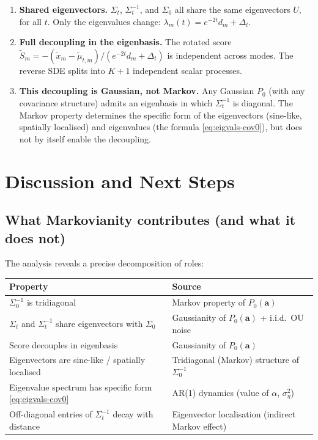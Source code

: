 \documentclass[11pt,a4paper]{article}
\newcommand{\Dt}{\Delta_t}
\newcommand{\sigeta}{\sigma_\eta^2}
\begin{document}
\begin{keyresult}
\begin{enumerate}[label=\textbf{\arabic*.}, leftmargin=2em]
  \item \textbf{Shared eigenvectors.}  $\Sigma_t$, $\Sigma_t^{-1}$, and $\Sigma_0$ all share the same eigenvectors $U$, for all $t$.  Only the eigenvalues change: $\lambda_m(t) = e^{-2t}d_m + \Dt$.

  \item \textbf{Full decoupling in the eigenbasis.}  The rotated score $\tilde{S}_m = -(\tilde{x}_m - \tilde{\mu}_{t,m})/(e^{-2t}d_m + \Dt)$ is independent across modes.  The reverse SDE splits into $K+1$ independent scalar processes.

  \item \textbf{This decoupling is Gaussian, not Markov.}  Any Gaussian $P_0$ (with any covariance structure) admits an eigenbasis in which $\Sigma_t^{-1}$ is diagonal.  The Markov property determines the specific form of the eigenvectors (sine-like, spatially localised) and eigenvalues (the formula \eqref{eq:eigvals-cov0}), but does not by itself enable the decoupling.
\end{enumerate}
\end{keyresult}


\section{Discussion and Next Steps}
\label{sec:discussion}

\subsection{What Markovianity contributes (and what it does not)}

The analysis reveals a precise decomposition of roles:

\medskip
\begin{tabular}{@{}lp{10cm}@{}}
\toprule
\textbf{Property} & \textbf{Source} \\
\midrule
$\Sigma_0^{-1}$ is tridiagonal & Markov property of $P_0(\mathbf{a})$ \\
$\Sigma_t$ and $\Sigma_t^{-1}$ share eigenvectors with $\Sigma_0$ & Gaussianity of $P_0(\mathbf{a})$ + i.i.d.\ OU noise \\
Score decouples in eigenbasis & Gaussianity of $P_0(\mathbf{a})$ \\
Eigenvectors are sine-like / spatially localised & Tridiagonal (Markov) structure of $\Sigma_0^{-1}$ \\
Eigenvalue spectrum has specific form \eqref{eq:eigvals-cov0} & AR(1) dynamics (value of $\alpha$, $\sigeta$) \\
Off-diagonal entries of $\Sigma_t^{-1}$ decay with distance & Eigenvector localisation (indirect Markov effect) \\
\bottomrule
\end{tabular}
\end{document}
